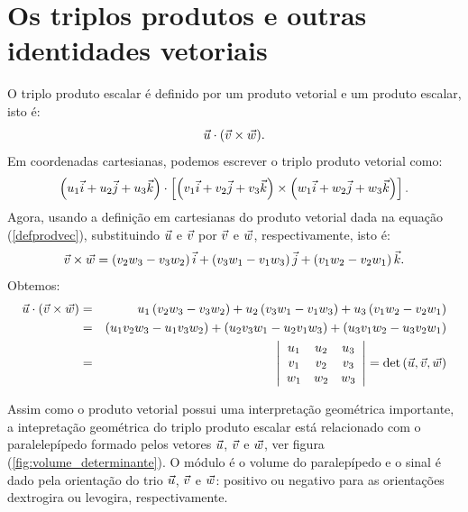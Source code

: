\section{Os triplos produtos e outras identidades vetoriais}
O triplo produto escalar é definido por um produto vetorial e um produto escalar, isto é:
\begin{equation}
 \vec{u}\cdot (\vec{v}\times \vec{w}).
\end{equation}
Em coordenadas cartesianas, podemos escrever o triplo produto vetorial como:
\begin{eqnarray*}
 \left(u_1\vec{i}+u_2\vec{j}+u_3\vec{k}\right)\cdot \left[\left(v_1\vec{i}+v_2\vec{j}+v_3\vec{k}\right)\times \left(w_1\vec{i}+w_2\vec{j}+w_3\vec{k}\right)\right].
\end{eqnarray*}
Agora, usando a definição em cartesianas do produto vetorial dada na equação (\ref{defprodvec}), substituindo $\vec{u}$ e $\vec{v}$ por $\vec{v}$ e $\vec{w}$, respectivamente, isto é:
\begin{equation*} \vec{v}\times\vec{w}=\left(v_2w_3-v_3w_2\right)\vec{i}+\left(v_3w_1-v_1w_3\right)\vec{j}+\left(v_1w_2-v_2w_1\right)\vec{k}.
\end{equation*}
Obtemos:
\begin{eqnarray}\label{dettriploprod}
  \vec{u}\cdot (\vec{v}\times \vec{w})
 &=&u_1\left(v_2w_3-v_3w_2\right)+u_2\left(v_3w_1-v_1w_3\right)+u_3\left(v_1w_2-v_2w_1\right)\nonumber\\
 &=&\left(u_1v_2w_3-u_1v_3w_2\right)+\left(u_2v_3w_1-u_2v_1w_3\right)+\left(u_3v_1w_2-u_3v_2w_1\right)\nonumber\\
 &=&
 \left|\begin{array}{ccc}
	  u_1&u_2&u_3\\
	  v_1&v_2&v_3\\
	  w_1&w_2&w_3
       \end{array}
 \right|=\det\left(\vec{u},\vec{v},\vec{w}\right)
\end{eqnarray}
\begin{obs}Assim como o produto vetorial possui uma interpretação geométrica importante, a intepretação geométrica do triplo produto escalar está relacionado com o paralelepípedo formado pelos vetores $\vec{u}$, $\vec{v}$ e $\vec{w}$, ver figura (\ref{fig:volume_determinante}). O módulo é o volume do paralepípedo e o sinal é dado pela orientação do trio $\vec{u}$, $\vec{v}$ e $\vec{w}$: positivo ou negativo para as orientações dextrogira ou levogira, respectivamente. \end{obs}
